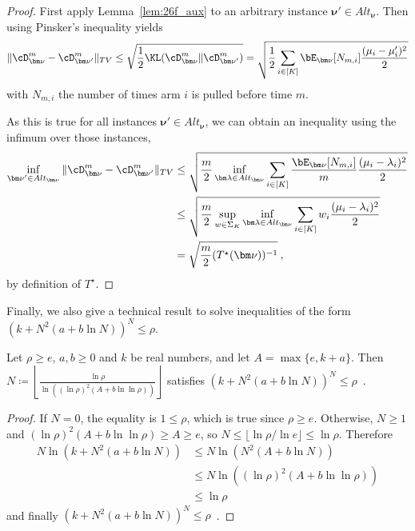 \begin{proof}
First apply Lemma~\ref{lem:26f_aux} to an arbitrary instance ${\bm\nu}' \in Alt_{\bm\nu}$. Then using Pinsker's inequality yields
\begin{align*}
\Vert \cD_{\bm\nu}^m - \cD_{{\bm\nu}'}^m \Vert_{TV}
\leq \sqrt{\frac{1}{2}\KL(\cD_{\bm\nu}^m\Vert \cD_{{\bm\nu}'}^m)}
= \sqrt{\frac{1}{2} \sum_{i\in[K]} \bE_{\bm\nu}[N_{m,i}] \frac{(\mu_i-\mu_i')^2}{2}}
\end{align*} with $N_{m,i}$ the number of times arm $i$ is pulled before time $m$.

As this is true for all instances ${\bm\nu}'\in Alt_{{\bm\nu}}$, we can obtain an inequality using the infimum over those instances,
\begin{align*}
\inf_{{\bm\nu}' \in Alt_{\bm\nu}} \Vert \cD_{\bm\nu}^m - \cD_{{\bm\nu}'}^m \Vert_{TV}
&\le \sqrt{\frac{m}{2} \inf_{\bm\lambda \in Alt_{{\bm\nu}}} \sum_{i\in[K]} \frac{\bE_{\bm\nu}[N_{m,i}]}{m} \frac{(\mu_i-\lambda_i)^2}{2}}
\\
&\le \sqrt{\frac{m}{2} \sup_{w\in \Sigma_K} \inf_{\bm\lambda \in Alt_{{\bm\nu}}} \sum_{i\in[K]} w_i \frac{(\mu_i-\lambda_i)^2}{2}}
\\
&=   \sqrt{\frac{m}{2} (T^\star(\bm\nu))^{-1}}
\: ,
\end{align*}
by definition of $T^\star$.
\end{proof}





Finally, we also give a technical result to solve inequalities of the form $(k+N^2(a+b\ln N))^N\leq \rho$.

\begin{lemma}\label{lem:suffN}
	Let $\rho \ge e$, $a,b\geq 0$ and $k$ be real numbers, and let $A=\max\{e,k+a\}$.
	Then $N \coloneqq \left\lfloor \frac{\ln \rho}{\ln((\ln \rho)^2(A+b\ln \ln \rho))}\right\rfloor$ satisfies $(k+N^2(a+b\ln N))^N\leq \rho$~.
\end{lemma}

\begin{proof}
	If $N=0$, the equality is $1 \le \rho$, which is true since $\rho \ge e$. Otherwise, $N\geq 1$ and $(\ln \rho)^2(A+b\ln\ln \rho)\geq A\geq e$,
	so $N \le \lfloor \ln\rho / \ln e \rfloor \leq \ln \rho$. Therefore
	\begin{align*}
		N\ln(k+N^2(a+b\ln N))&\leq N\ln (N^2(A+b\ln N))
		\\
		&\leq N\ln((\ln \rho)^2(A+b\ln \ln \rho))
		\\
		&\leq \ln \rho
	\end{align*}
	and finally $(k+N^2(a+b\ln N))^N\leq \rho$~.
\end{proof}

